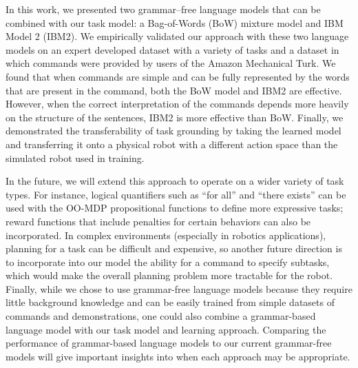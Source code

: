 \documentclass[conference]{IEEEtran}
\begin{document}
In this work, we presented two grammar--free language models that can be combined with our task model: a Bag-of-Words (BoW) mixture model and IBM Model 2 (IBM2). %
We empirically validated our approach with these two language models on an expert developed dataset with a variety of tasks and a dataset in which commands were provided by users of the Amazon Mechanical Turk. We found that when commands are simple and can be fully represented by the words that are present in the command, both the BoW model and IBM2 are effective. However, when the correct interpretation of the commands depends more heavily on the structure of the sentences, IBM2 is more effective than BoW. Finally, we demonstrated the transferability of task grounding by taking the learned model and transferring it onto a physical robot with a different action space than the simulated robot used in training.

In the future, we will extend this approach to operate on a wider variety of task types. For instance, logical quantifiers such as ``for all'' and ``there exists'' can be used with the OO-MDP propositional functions to define more expressive tasks; reward functions that include penalties for certain behaviors can also be incorporated. %
In complex environments (especially in robotics applications), planning for a task can be difficult and expensive, so another future direction is to incorporate into our model the ability for a command to specify subtasks, which would make the overall planning problem more tractable for the robot. Finally, while we chose to use grammar-free language models because they require little background knowledge and can be easily trained from simple datasets of commands and demonstrations, one could also combine a grammar-based language model with our task model and learning approach.  Comparing the performance of grammar-based language models to our current grammar-free models will give important insights into when each approach may be appropriate.




 

 
\end{document}
